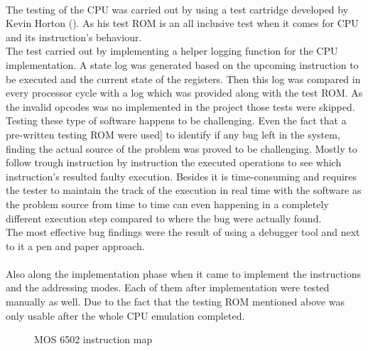 \documentclass[]{report}
\begin{document}
\paragraph{ }
The testing of the CPU was carried out by using a test cartridge developed by Kevin Horton (\cite{NEST}). As his test ROM is an all inclusive test when it comes for CPU and its instruction's behaviour.
\\
The test carried out by implementing a helper logging function for the CPU implementation. A state log was generated based on the upcoming instruction to be executed and the current state of the registers. Then this log was compared in every processor cycle with a log which was provided along with the test ROM. 
As the invalid opcodes was no implemented in the project those tests were skipped.
\\
Testing these type of software happens to be challenging. Even the fact that a pre-written testing ROM were used] to identify if any bug left in the system, finding the actual source of the problem was proved to be challenging. Mostly to follow trough instruction by instruction the executed operations to see which instruction's resulted faulty execution. Besides it is time-consuming and requires the tester to maintain the track of the execution in real time with the software as the problem source from time to time can even happening in a completely different execution step compared to where the bug were actually found.
\\
The most effective bug findings were the result of using a debugger tool and next to it a pen and paper approach.
\paragraph{ }
Also along the implementation phase when it came to implement the instructions and the addressing modes.
Each of them after implementation were tested manually as well. Due to the fact that the testing ROM mentioned above was only usable after the whole CPU emulation completed.

\begin{figure}[h]
	\caption{\label{fig:my-label} MOS 6502 instruction map}
\end{figure}
\end{document}
